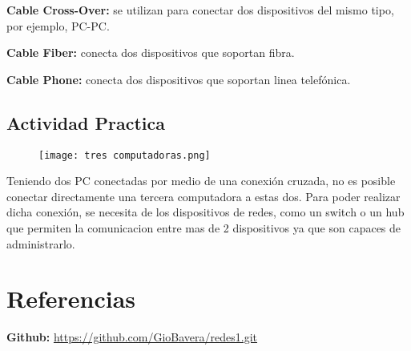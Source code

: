 \documentclass{article}
\begin{document}
\textbf{Cable Cross-Over:} se utilizan para conectar dos dispositivos del mismo tipo, por ejemplo, PC-PC.

\textbf{Cable Fiber:} conecta dos dispositivos que soportan fibra. 

\textbf{Cable Phone:} conecta dos dispositivos que soportan linea telefónica. 

\subsection{Actividad Practica}

\begin{figure}[H]
    \centering
    \texttt{[image: tres computadoras.png]}
    \caption{}
    \label{fig:enter-label}
\end{figure}

Teniendo dos PC conectadas por medio de una conexión cruzada, no es posible conectar directamente una tercera computadora a estas dos. Para poder realizar dicha conexión, se necesita de los dispositivos de redes, como un switch o un hub que permiten la comunicacion entre mas de 2 dispositivos ya que son capaces de administrarlo. 

\section{Referencias}

\textbf{Github:} \url{https://github.com/GioBavera/redes1.git}
\end{document}
